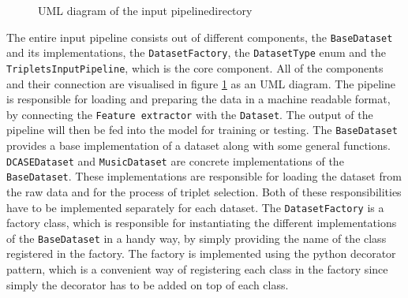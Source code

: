 \begin{figure}[htbp]
{
    }
	\caption{UML diagram of the \flqq input pipeline\frqq directory}
	\label{fig:UML-Input-Pipeline}
\end{figure}
\noindent
The entire input pipeline consists out of different components, the \texttt{BaseDataset} and its implementations, the \texttt{DatasetFactory}, the \texttt{DatasetType} enum and the \texttt{TripletsInputPipeline}, which is the core component. All of the components and their connection are visualised in figure \ref{fig:UML-Input-Pipeline} as an UML diagram. The pipeline is responsible for loading and preparing the data in a machine readable format, by connecting the \texttt{Feature extractor} with the \texttt{Dataset}. The output of the pipeline will then be fed into the model for training or testing.
\newline
\newline
The \texttt{BaseDataset} provides a base implementation of a dataset along with some general functions. \texttt{DCASEDataset} and \texttt{MusicDataset} are concrete implementations of the \texttt{BaseDataset}. These implementations are responsible for loading the dataset from the raw data and for the process of triplet selection. Both of these responsibilities have to be implemented separately for each dataset. The \texttt{DatasetFactory} is a factory class, which is responsible for instantiating the different implementations of the \texttt{BaseDataset} in a handy way, by simply providing the name of the class registered in the factory. The factory is implemented using the python decorator pattern, which is a convenient way of registering each class in the factory since simply the decorator has to be added on top of each class.
